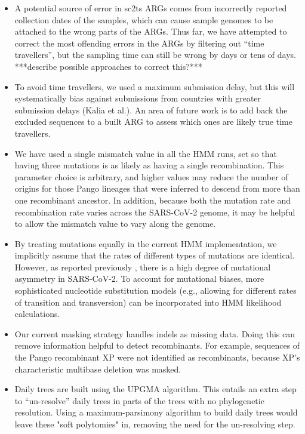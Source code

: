 \documentclass{article}
\begin{document}
\begin{itemize}
\item A potential source of error in sc2ts ARGs comes from incorrectly reported collection dates of the samples, which can cause sample genomes to be attached to the wrong parts of the ARGs. Thus far, we have attempted to correct the most offending errors in the ARGs by filtering out ``time travellers'', but the sampling time can still be wrong by days or tens of days. ***describe possible approaches to correct this?***
\item To avoid time travellers, we used a maximum submission delay, but this will systematically bias against submissions from countries with greater submission delays (Kalia et al.). An area of future work is to add back the excluded sequences to a built ARG to assess which ones are likely true time travellers.
\item We have used a single mismatch value in all the HMM runs, set so that having three mutations is as likely as having a single recombination. This parameter choice is arbitrary, and higher values may reduce the number of origins for those Pango lineages that were inferred to descend from more than one recombinant ancestor. In addition, because both the mutation rate and recombination rate varies across the SARS-CoV-2 genome, it may be helpful to allow the mismatch value to vary along the genome.
\item By treating mutations equally in the current HMM implementation, we implicitly assume that the rates of different types of mutations are identical. However, as reported previously \citep{Yi2021-sc}, there is a high degree of mutational asymmetry in SARS-CoV-2. To account for mutational biases, more sophisticated nucleotide substitution models (e.g., allowing for different rates of transition and transversion) can be incorporated into HMM likelihood calculations.
\item Our current masking strategy handles indels as missing data. Doing this can remove information helpful to detect recombinants. For example, sequences of the Pango recombinant XP were not identified as recombinants, because XP’s characteristic multibase deletion was masked.
\item Daily trees are built using the UPGMA algorithm. This entails an extra step to ``un-resolve'' daily trees in parts of the trees with no phylogenetic resolution. Using a maximum-parsimony algorithm to build daily trees would leave these "soft polytomies" in, removing the need for the un-resolving step.
\end{itemize}
\end{document}
